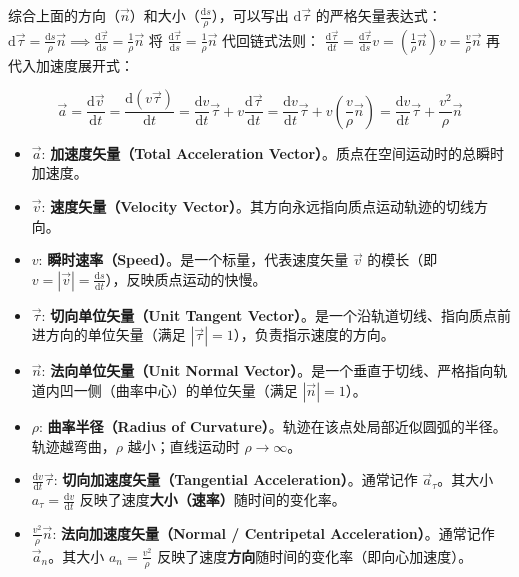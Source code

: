 综合上面的方向（$\vec{n}$）和大小（$\frac{\mathrm{d}s}{\rho}$），可以写出 $\mathrm{d}\vec{\tau}$ 的严格矢量表达式： \(\mathrm{d}\vec{\tau} = \frac{\mathrm{d}s}{\rho}\vec{n} \implies \frac{\mathrm{d}\vec{\tau}}{\mathrm{d}s} = \frac{1}{\rho}\vec{n}\) 
将 $\frac{\mathrm{d}\vec{\tau}}{\mathrm{d}s} = \frac{1}{\rho}\vec{n}$ 代回链式法则： \(\frac{\mathrm{d}\vec{\tau}}{\mathrm{d}t} = \frac{\mathrm{d}\vec{\tau}}{\mathrm{d}s} v = \left(\frac{1}{\rho}\vec{n}\right) v = \frac{v}{\rho}\vec{n}\) 再代入加速度展开式：
\begin{definition}
$$\vec{a} = \frac{\mathrm{d}\vec{v}}{\mathrm{d}t} = \frac{\mathrm{d}(v\vec{\tau})}{\mathrm{d}t} = \frac{\mathrm{d}v}{\mathrm{d}t}\vec{\tau} + v\frac{\mathrm{d}\vec{\tau}}{\mathrm{d}t} = \frac{\mathrm{d}v}{\mathrm{d}t}\vec{\tau} + v\left(\frac{v}{\rho}\vec{n}\right)= \frac{\mathrm{d}v}{\mathrm{d}t}\vec{\tau} + \frac{v^2}{\rho}\vec{n}$$
\begin{itemize}
\item $\vec{a}$: \textbf{加速度矢量（Total Acceleration Vector）}。质点在空间运动时的总瞬时加速度。
\item $\vec{v}$: \textbf{速度矢量（Velocity Vector）}。其方向永远指向质点运动轨迹的切线方向。
\item $v$: \textbf{瞬时速率（Speed）}。是一个标量，代表速度矢量 $\vec{v}$ 的模长（即 $v = |\vec{v}| = \frac{\mathrm{d}s}{\mathrm{d}t}$），反映质点运动的快慢。
\item $\vec{\tau}$: \textbf{切向单位矢量（Unit Tangent Vector）}。是一个沿轨道切线、指向质点前进方向的单位矢量（满足 $|\vec{\tau}| = 1$），负责指示速度的方向。
\item $\vec{n}$: \textbf{法向单位矢量（Unit Normal Vector）}。是一个垂直于切线、严格指向轨道内凹一侧（曲率中心）的单位矢量（满足 $|\vec{n}| = 1$）。
\item $\rho$: \textbf{曲率半径（Radius of Curvature）}。轨迹在该点处局部近似圆弧的半径。轨迹越弯曲，$\rho$ 越小；直线运动时 $\rho \to \infty$。
\item $\frac{\mathrm{d}v}{\mathrm{d}t}\vec{\tau}$: \textbf{切向加速度矢量（Tangential Acceleration）}。通常记作 $\vec{a}_\tau$。其大小 $a_\tau = \frac{\mathrm{d}v}{\mathrm{d}t}$ 反映了速度\textbf{大小（速率）}随时间的变化率。
\item $\frac{v^2}{\rho}\vec{n}$: \textbf{法向加速度矢量（Normal / Centripetal Acceleration）}。通常记作 $\vec{a}_n$。其大小 $a_n = \frac{v^2}{\rho}$ 反映了速度\textbf{方向}随时间的变化率（即向心加速度）。
\end{itemize}
\end{definition}
